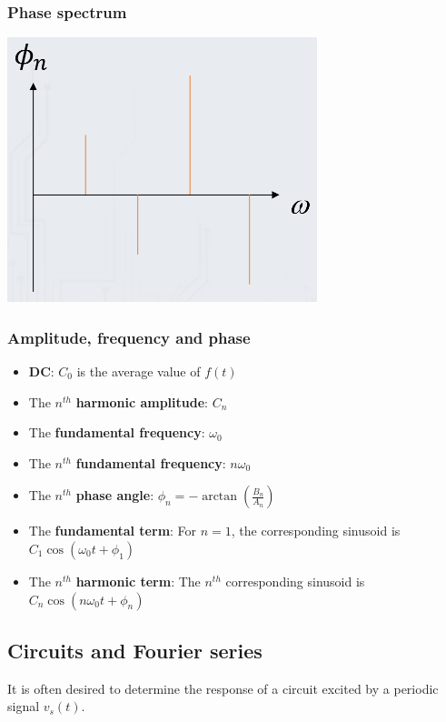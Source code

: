 \documentclass[11pt]{article}
\begin{document}
\subsubsection{Phase spectrum}
\label{sec:org24fc783}
\begin{center}
\includegraphics[width=.9\linewidth]{./images/phase-spectrum.png}
\end{center}
\subsubsection{Amplitude, frequency and phase}
\label{sec:orgdab77b0}
\begin{itemize}
\item \textbf{DC}: \(C_0\) is the average value of \(f(t)\)
\item The \(n^{th}\) \textbf{harmonic amplitude}: \(C_n\)
\item The \textbf{fundamental frequency}: \(\omega_0\)
\item The \(n^{th}\) \textbf{fundamental frequency}: \(n \omega_0\)
\item The \(n^{th}\) \textbf{phase angle}: \(\phi_n = - \arctan \left(\frac{B_n}{A_n} \right)\)
\item The \textbf{fundamental term}: For \(n = 1\), the corresponding sinusoid is \(C_1 \cos (\omega_0 t + \phi_1)\)
\item The \(n^{th}\) \textbf{harmonic term}: The \(n^{th}\) corresponding sinusoid is \(C_n \cos (n \omega_0 t + \phi_n)\)
\end{itemize}
\subsection{Circuits and Fourier series}
\label{sec:org69840af}
It is often desired to determine the response of a circuit excited by a periodic signal \(v_s (t)\).
\end{document}
